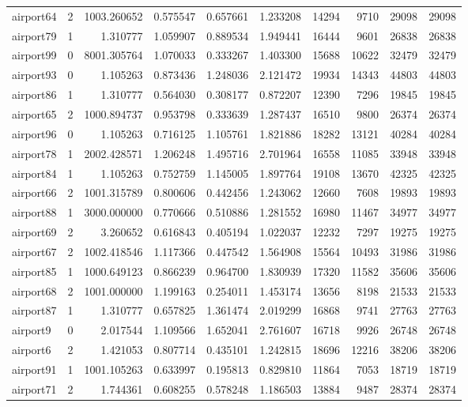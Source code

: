\begin{longtable}{|l|r|r|r|r|r|r|r|r|r|}
airport64 & 2 & 1003.260652 & 0.575547 & 0.657661 & 1.233208 & 14294 & 9710 & 29098 & 29098 \\
airport79 & 1 & 1.310777 & 1.059907 & 0.889534 & 1.949441 & 16444 & 9601 & 26838 & 26838 \\
airport99 & 0 & 8001.305764 & 1.070033 & 0.333267 & 1.403300 & 15688 & 10622 & 32479 & 32479 \\
airport93 & 0 & 1.105263 & 0.873436 & 1.248036 & 2.121472 & 19934 & 14343 & 44803 & 44803 \\
airport86 & 1 & 1.310777 & 0.564030 & 0.308177 & 0.872207 & 12390 & 7296 & 19845 & 19845 \\
airport65 & 2 & 1000.894737 & 0.953798 & 0.333639 & 1.287437 & 16510 & 9800 & 26374 & 26374 \\
airport96 & 0 & 1.105263 & 0.716125 & 1.105761 & 1.821886 & 18282 & 13121 & 40284 & 40284 \\
airport78 & 1 & 2002.428571 & 1.206248 & 1.495716 & 2.701964 & 16558 & 11085 & 33948 & 33948 \\
airport84 & 1 & 1.105263 & 0.752759 & 1.145005 & 1.897764 & 19108 & 13670 & 42325 & 42325 \\
airport66 & 2 & 1001.315789 & 0.800606 & 0.442456 & 1.243062 & 12660 & 7608 & 19893 & 19893 \\
airport88 & 1 & 3000.000000 & 0.770666 & 0.510886 & 1.281552 & 16980 & 11467 & 34977 & 34977 \\
airport69 & 2 & 3.260652 & 0.616843 & 0.405194 & 1.022037 & 12232 & 7297 & 19275 & 19275 \\
airport67 & 2 & 1002.418546 & 1.117366 & 0.447542 & 1.564908 & 15564 & 10493 & 31986 & 31986 \\
airport85 & 1 & 1000.649123 & 0.866239 & 0.964700 & 1.830939 & 17320 & 11582 & 35606 & 35606 \\
airport68 & 2 & 1001.000000 & 1.199163 & 0.254011 & 1.453174 & 13656 & 8198 & 21533 & 21533 \\
airport87 & 1 & 1.310777 & 0.657825 & 1.361474 & 2.019299 & 16868 & 9741 & 27763 & 27763 \\
airport9 & 0 & 2.017544 & 1.109566 & 1.652041 & 2.761607 & 16718 & 9926 & 26748 & 26748 \\
airport6 & 2 & 1.421053 & 0.807714 & 0.435101 & 1.242815 & 18696 & 12216 & 38206 & 38206 \\
airport91 & 1 & 1001.105263 & 0.633997 & 0.195813 & 0.829810 & 11864 & 7053 & 18719 & 18719 \\
airport71 & 2 & 1.744361 & 0.608255 & 0.578248 & 1.186503 & 13884 & 9487 & 28374 & 28374 \\

\end{longtable}
